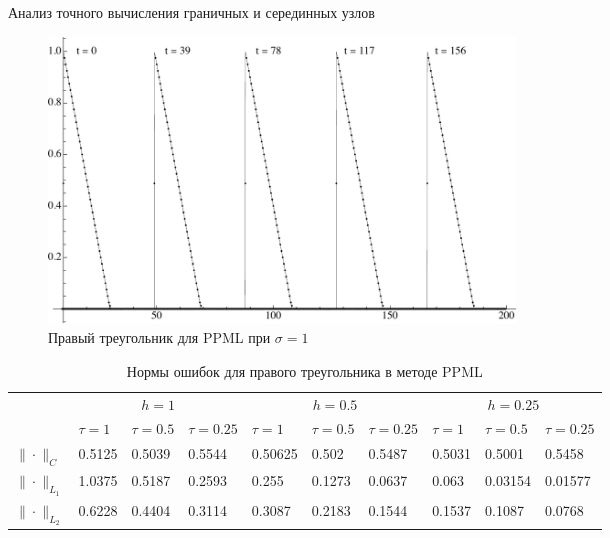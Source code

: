 \documentclass[unicode, 8pt]{beamer}
\begin{document}
    \begin{frame}{Анализ точного вычисления граничных и серединных узлов}
        \begin{figure}[h]
            \centering
            \includegraphics[width=0.6\textwidth]{sigma=1./advectionPPML_rightTriangle.pdf}
            \caption{Правый треугольник для PPML при $ \sigma = 1 $}
            \label{fig:ppml_rightTriangle_1}
        \end{figure}
        \begin{table}[h]
            \centering
            \caption{Нормы ошибок для правого треугольника в методе PPML}
            \label{table:ltPPML}
            \scalebox{0.75} {
                \begin{tabular}{|*{10}{C{.45in}|}}
                    \hline
                    &  &  &  \\
                    & $\tau=1$ & $\tau=0.5$ & $\tau=0.25$ & $\tau=1$ & $\tau=0.5$ & $\tau=0.25$ & $\tau=1$ & $\tau=0.5$ & $\tau=0.25$ 
                    \\ \hline
                    $\| \cdot \|_{C}$ & 0.5125 & 0.5039 & 0.5544 & 0.50625 & 0.502 & 0.5487 & 0.5031 & 0.5001 & 0.5458
                    \\ \hline
                    $\| \cdot \|_{L_1}$ & 1.0375 & 0.5187 & 0.2593 & 0.255 & 0.1273 & 0.0637 & 0.063 & 0.03154 & 0.01577
                    \\ \hline
                    $\| \cdot \|_{L_2}$ & 0.6228 & 0.4404 & 0.3114 & 0.3087 & 0.2183 & 0.1544 & 0.1537 & 0.1087 & 0.0768  
                    \\ \hline
                \end{tabular}
            }
        \end{table}
    \end{frame}
\end{document}
